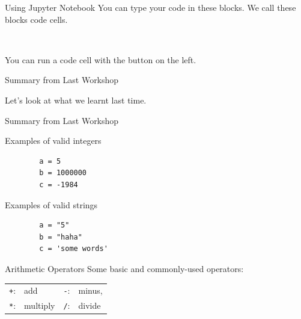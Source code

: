 \documentclass[dvipsnames, svgnames, x11names, handout]{beamer}
\begin{document}
\begin{frame}[fragile]{Using Jupyter Notebook}
    You can type your code in these blocks. We call these blocks code cells.

    \begin{center}
    \end{center}

    \

    You can run a code cell with the button on the left.

    \begin{center}
    \end{center}
\end{frame}

\begin{frame}[fragile]{Summary from Last Workshop}
    \begin{center}
        Let's look at what we learnt last time.
    \end{center}
\end{frame}

\begin{frame}[fragile]{Summary from Last Workshop}
    \begin{block}{Examples of valid integers}
        \begin{verbatim}
        a = 5  
        b = 1000000   
        c = -1984
        \end{verbatim}
    \end{block}
    \begin{block}{Examples of valid strings}
        \begin{verbatim}
        a = "5"
        b = "haha"   
        c = 'some words'
        \end{verbatim}
    \end{block}
    \begin{block}{Arithmetic Operators}
        Some basic and commonly-used operators:\\
        \centering
        \begin{tabular}{rlrl}
        \texttt{+}:& add & \texttt{-}:& minus,\\
        \texttt{*}:& multiply & \texttt{/}:& divide
        \end{tabular}
    \end{block}
\end{frame}
\end{document}
